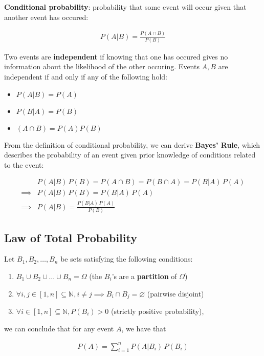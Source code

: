 \documentclass[a4paper,10pt]{article}
\newcommand{\N}{\mathbb{N}}
\begin{document}
\textbf{Conditional probability}: probability that some event will occur given that another event has occured:

\begin{align*}
    P(A|B) = \frac{P(A\cap B)}{P(B)}
\end{align*}

Two events are \textbf{independent} if knowing that one has occured gives no information about the likelihood of the other occuring. Events $A, B$ are independent if and only if any of the following hold: 

\begin{itemize}
    \item $P(A|B) = P(A)$
    \item $P(B|A) = P(B)$
    \item $(A\cap B) = P(A)P(B)$
\end{itemize}

From the definition of conditional probability, we can derive \textbf{Bayes' Rule}, which describes the probability of an event given prior knowledge of conditions related to the event: 

\begin{align*}
    &P(A|B)\,P(B) = P(A\cap B) = P(B\cap A) = P(B|A)\,P(A) \\[0.1cm]
    \implies &P(A|B)\,P(B) = P(B|A)\,P(A) \\[0.1cm]
    \implies &P(A|B) = \frac{P(B|A)\,P(A)}{P(B)} 
\end{align*}

\subsection{Law of Total Probability}

Let $B_1, B_2, \ldots, B_n$ be sets satisfying the following conditions:

\begin{enumerate}
    \item $B_1\cup B_2\cup \ldots \cup B_n = \Omega$ (the $B_i$'s are a \textbf{partition} of $\Omega$)
    \item $\forall i, j \in [1, n]\subseteq \N, i\neq j \implies B_i\cap B_j = \varnothing$ (pairwise disjoint)
    \item $\forall i \in [1, n]\subseteq \N, P(B_i) > 0$ (strictly positive probability),
\end{enumerate}

we can conclude that for any event $A$, we have that 

\begin{align*}
    P(A) = \sum_{i=1}^n P(A|B_i)\,P(B_i)
\end{align*}
\end{document}
